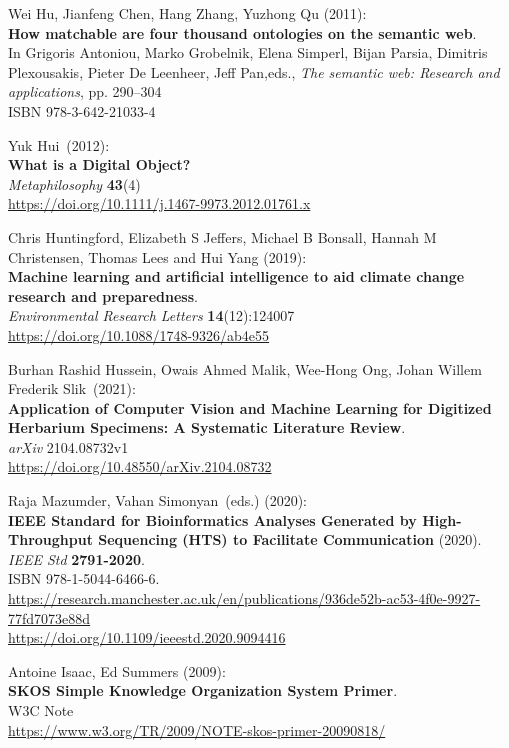 \begin{thebibliography}{9}
Wei Hu, Jianfeng Chen, Hang Zhang, Yuzhong Qu (2011): \\
\textbf{How matchable are four thousand ontologies on the semantic web}. \\
In Grigoris
Antoniou, Marko Grobelnik, Elena Simperl, Bijan Parsia, Dimitris
Plexousakis, Pieter De Leenheer, Jeff Pan,eds., \emph{The semantic
web: {Research} and applications}, pp. 290--304 \\
ISBN 978-3-642-21033-4

Yuk Hui~(2012):\\
\textbf{What is a Digital Object?}\\
\emph{Metaphilosophy} \textbf{43}(4)\\
\url{https://doi.org/10.1111/j.1467-9973.2012.01761.x}

Chris Huntingford, Elizabeth S Jeffers, Michael B Bonsall, Hannah M Christensen, Thomas Lees and Hui Yang (2019):\\
\textbf{Machine learning and artificial intelligence to aid climate change research and preparedness}.\\
\emph{Environmental Research Letters} \textbf{14}(12):124007\\
\url{https://doi.org/10.1088/1748-9326/ab4e55}

Burhan Rashid Hussein, Owais Ahmed Malik, Wee-Hong Ong, Johan Willem Frederik Slik~(2021):\\
\textbf{Application of Computer Vision and Machine Learning for Digitized
Herbarium Specimens: A Systematic Literature Review}.\\
\emph{arXiv} 2104.08732v1\\
\url{https://doi.org/10.48550/arXiv.2104.08732}

Raja Mazumder, Vahan Simonyan~(eds.) (2020):\\
\textbf{IEEE Standard for Bioinformatics Analyses Generated by
High-Throughput Sequencing (HTS) to Facilitate Communication} (2020).\\
\emph{IEEE Std} \textbf{2791-2020}.\\
ISBN 978-1-5044-6466-6.\\
\url{https://research.manchester.ac.uk/en/publications/936de52b-ac53-4f0e-9927-77fd7073e88d}\\
\url{https://doi.org/10.1109/ieeestd.2020.9094416}

Antoine Isaac, Ed Summers (2009): \\
\textbf{SKOS Simple Knowledge Organization System Primer}. \\
W3C Note \\
\url{https://www.w3.org/TR/2009/NOTE-skos-primer-20090818/}


\end{thebibliography}
